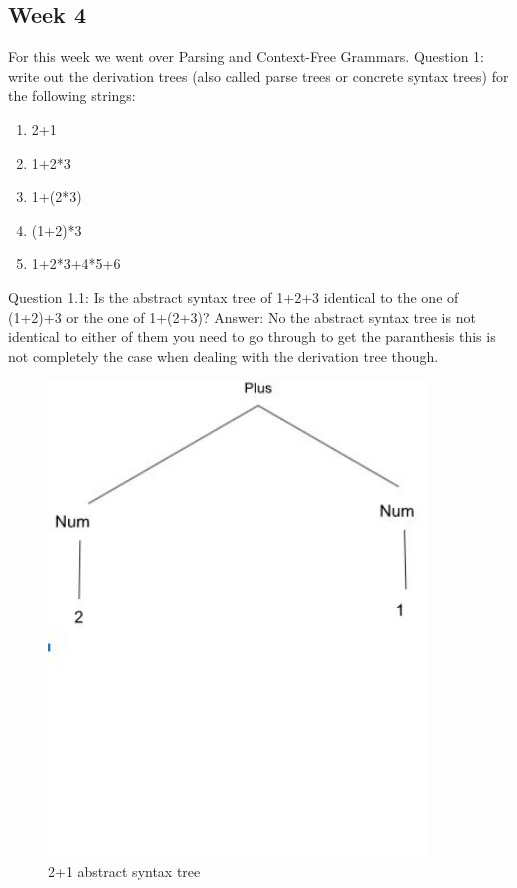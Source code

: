 \documentclass{article}
\theoremstyle{theorem}
\theoremstyle{definition}
\theoremstyle{remark}
\begin{document}
\subsection{Week 4}
For this week we went over Parsing and Context-Free Grammars.
Question 1:
write out the derivation trees (also called parse trees or concrete syntax trees) for the following strings:
\begin{enumerate}

\item 2+1
\item 1+2*3
\item 1+(2*3)
\item (1+2)*3
\item 1+2*3+4*5+6

    \end{enumerate}
    Question 1.1:
    Is the abstract syntax tree of 1+2+3 identical to the one of (1+2)+3 or the one of 1+(2+3)?
    Answer: No the abstract syntax tree is not identical to either of them you need to go through to get the paranthesis this is not completely the case when dealing with the derivation tree though.
 \begin{figure}[htp]
    \centering
    \includegraphics[width=10cm]{1st}
    \caption{ 2+1  abstract syntax tree }
    \label{fig: 2+1}
\end{figure}
\end{document}
